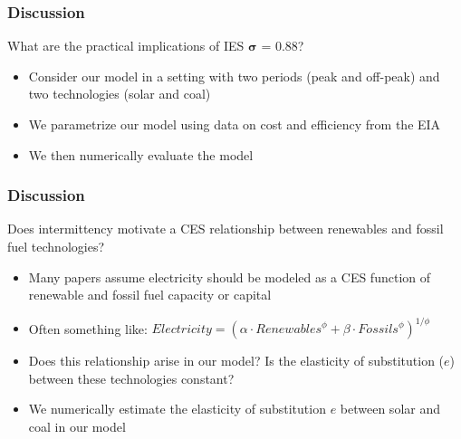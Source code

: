 \documentclass[aspectratio=169]{beamer}
\begin{document}
	
	\begin{frame}
		\frametitle{Discussion}
		
		\vspace{2em}
		
		\begin{block}{\centering What are the practical implications of IES $\boldsymbol{\sigma}$ = 0.88?}
		\end{block}
		
		\vspace{1em}
		
		\begin{itemize}
			\setlength\itemsep{0.5em}
			\item Consider our model in a setting with two periods (peak and off-peak) and two technologies (solar and coal)
			\item We parametrize our  model using data on cost and efficiency from the EIA
			\item We then numerically evaluate the model
		\end{itemize}
		
	\end{frame}
	
	
	\begin{frame}
		\frametitle{Discussion}
		
		\vspace{2em}
		
		\begin{block}{Does intermittency motivate a CES relationship between renewables and fossil fuel technologies? }
			\begin{itemize}
				\setlength\itemsep{0.5em}
				\item<1-> Many papers assume electricity should be modeled as a CES function of renewable and fossil fuel capacity or capital
				\item<1-> Often something like: $Electricity = (\alpha \cdot {Renewables}^\phi + \beta \cdot {Fossils}^\phi)^{1/\phi}$
				\item<2-> Does this relationship arise in our model? Is the elasticity of substitution ($e$) between these technologies constant? 
				\item<2-> We numerically estimate the elasticity of substitution $e$ between solar and coal in our model
			\end{itemize}
		\end{block}
		
		\vspace{1em}
		
	\end{frame}
	
\end{document}
